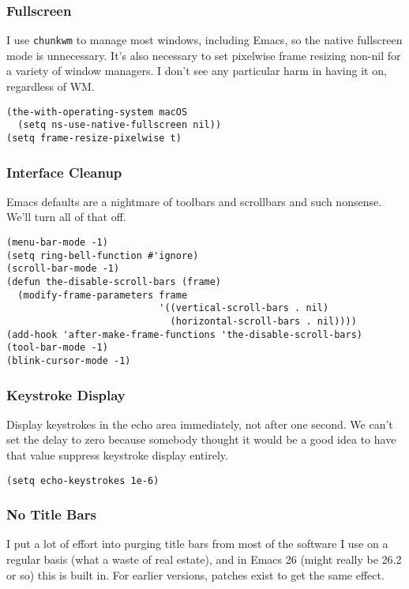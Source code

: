 \documentclass[11pt]{article}
\begin{document}
\subsubsection{Fullscreen}
\label{sec:org7a70531}
I use \texttt{chunkwm} to manage most windows, including Emacs, so the native
fullscreen mode is unnecessary. It's also necessary to set pixelwise
frame resizing non-nil for a variety of window managers. I don't see
any particular harm in having it on, regardless of WM.

\begin{verbatim}
(the-with-operating-system macOS
  (setq ns-use-native-fullscreen nil))
(setq frame-resize-pixelwise t)
\end{verbatim}

\subsubsection{Interface Cleanup}
\label{sec:org2ed8faf}
Emacs defaults are a nightmare of toolbars and scrollbars and such
nonsense. We'll turn all of that off.

\begin{verbatim}
(menu-bar-mode -1)
(setq ring-bell-function #'ignore)
(scroll-bar-mode -1)
(defun the-disable-scroll-bars (frame)
  (modify-frame-parameters frame
                           '((vertical-scroll-bars . nil)
                             (horizontal-scroll-bars . nil))))
(add-hook 'after-make-frame-functions 'the-disable-scroll-bars)
(tool-bar-mode -1)
(blink-cursor-mode -1)
\end{verbatim}

\subsubsection{Keystroke Display}
\label{sec:org1af20ca}
Display keystrokes in the echo area immediately, not after one
second. We can't set the delay to zero because somebody thought it
would be a good idea to have that value suppress keystroke display
entirely.

\begin{verbatim}
(setq echo-keystrokes 1e-6)
\end{verbatim}

\subsubsection{No Title Bars}
\label{sec:org6b64fe7}
I put a lot of effort into purging title bars from most of the
software I use on a regular basis (what a waste of real estate), and
in Emacs 26 (might really be 26.2 or so) this is built in. For earlier
versions, patches exist to get the same effect.
\end{document}
